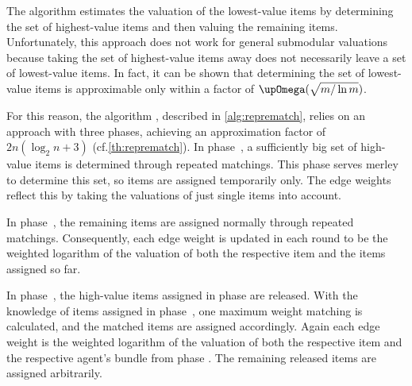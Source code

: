 The algorithm \SMatch{} estimates the valuation of the lowest-value items by determining the set of highest-value items and then valuing the remaining items.
Unfortunately, this approach does not work for general submodular valuations because taking the set of highest-value items away does not necessarily leave a set of lowest-value items.
In fact, it can be shown \cite{submodular_low_value} that determining the set of lowest-value items is approximable only within a factor of \(\bigomega(\sqrt{m / \ln m})\).

For this reason, the algorithm \RepReMatch, described in \cref{alg:reprematch}, relies on an approach with three phases, achieving an approximation factor of \(2n(\log_2 n + 3)\) (cf.\@ \cref{th:reprematch}).
In phase~\phasei, a sufficiently big set of high-value items is determined through repeated matchings.
This phase serves merley to determine this set, so items are assigned temporarily only.
The edge weights reflect this by taking the valuations of just single items into account.

In phase~\phaseii, the remaining items are assigned normally through repeated matchings.
Consequently, each edge weight is updated in each round to be the weighted logarithm of the valuation of both the respective item and the items assigned so far.

In phase~\phaseiii, the high-value items assigned in phase \phasei{} are released.
With the knowledge of items assigned in phase~\phaseii, one maximum weight matching is calculated, and the matched items are assigned accordingly.
Again each edge weight is the weighted logarithm of the valuation of both the respective item and the respective agent's bundle from phase \phaseii.
The remaining released items are assigned arbitrarily.

